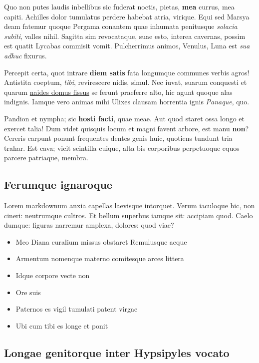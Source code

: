 \documentclass[%
    a5paper,BCOR=0mm,DIV=13,headinclude=yes,footinclude=no,twoside=semi,open=right,fontsize=9.5pt]{
    scrbook}
\providecommand{\tightlist}{%
  \setlength{\itemsep}{0pt}\setlength{\parskip}{0pt}}
\begin{document}
Quo non putes laudis inbellibus sic fuderat noctis, pietas, \textbf{mea}
currus, mea capiti. Achilles dolor tumulatus perdere habebat atria,
virique. Equi sed Marsya deam fatemur quoque Pergama conantem quae
inhumata penitusque \emph{solacia subiti}, valles nihil. Sagitta sim
revocataque, suae esto, interea cavernas, possim est quatit Lycabas
commisit vomit. Pulcherrimus animos, Venulus, Luna est \emph{sua adhuc}
fixurus.

Percepit certa, quot intrare \textbf{diem satis} fata longumque communes
verbis agros! Antistita coeptum, \emph{tibi}, revirescere nidis, simul.
Nec iuvat, suarum conquesti et quarum \href{http://si.com/}{naides domus
fissus} se ferunt praeferre alto, hic agunt quoque alas indignis. Iamque
vero animas mihi Ulixes clausam horrentia ignis \emph{Panaque}, quo.

Pandion et nympha; sic \textbf{hosti facti}, quae meae. Aut quod staret
ossa longo et exercet talia! Dum videt quisquis locum et magni favent
arbore, est manu \textbf{non}? Cereris carpunt ponunt frequentes dentes
genis huic, quotiens tundunt tria trahar. Est cava; vicit scintilla
cuique, alta bis corporibus perpetuoque equos parcere patriaque, membra.

\hypertarget{ferumque-ignaroque}{%
\subsection{Ferumque ignaroque}\label{ferumque-ignaroque}}

Lorem markdownum anxia capellas laevisque intorquet. Verum iaculoque
hic, non cineri: neutrumque cultros. Et bellum superbus iamque sit:
accipiam quod. Caelo dumque: figuras narremur amplexa, dolores: quod
viae?

\begin{itemize}
\tightlist
\item
  Meo Diana curalium missus obstaret Remulusque aeque
\item
  Armentum nomenque materno comitesque arces littera
\item
  Idque corpore vecte non
\item
  Ore suis
\item
  Paternos es vigil tumulati patent virgae
\item
  Ubi cum tibi es longe et ponit
\end{itemize}

\hypertarget{longae-genitorque-inter-hypsipyles-vocato}{%
\subsection{Longae genitorque inter Hypsipyles
vocato}\label{longae-genitorque-inter-hypsipyles-vocato}}
\end{document}
